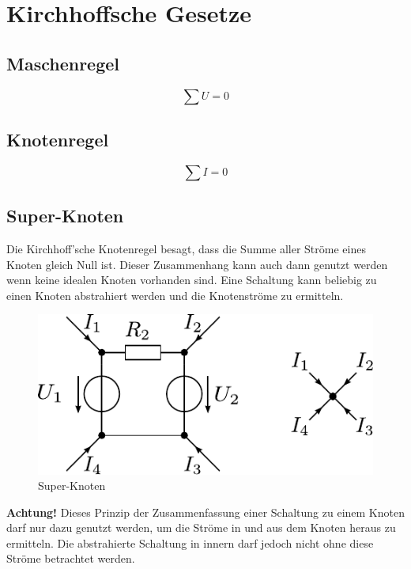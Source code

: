 



\section{Kirchhoffsche Gesetze}

\subsection{Maschenregel}
\[ \sum U = 0 \]

\subsection{Knotenregel}
\[ \sum I = 0 \]

\subsection{Super-Knoten}
Die Kirchhoff'sche Knotenregel besagt, dass die Summe aller Ströme eines Knoten gleich Null ist.
Dieser Zusammenhang kann auch dann genutzt werden wenn keine idealen Knoten vorhanden sind.
Eine Schaltung kann beliebig zu einen Knoten abstrahiert werden und die Knotenströme zu ermitteln.

\begin{figure}[h!]
\centering
\includegraphics[scale=\schscale]{supernode_sch.pdf}
\caption{Super-Knoten}
\label{sch:supernode}
\end{figure}

\noindent
\textbf{Achtung!} Dieses Prinzip der Zusammenfassung einer Schaltung zu einem Knoten darf nur dazu genutzt werden, um die Ströme in und aus dem Knoten heraus zu ermitteln. Die abstrahierte Schaltung in innern darf jedoch nicht ohne diese Ströme betrachtet werden. 
